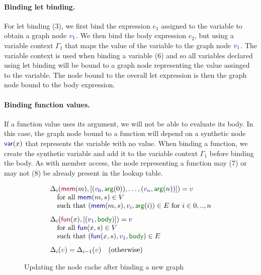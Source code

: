 \documentclass[sigplan,10pt]{acmart}\settopmatter{printfolios=true,printccs=false,printacmref=false}
\newcommand{\kvd}[1]{\textnormal{\textcolor{kvdclr}{\sffamily #1}}}
\newcommand{\bndclr}[1]{\textcolor{kvdclr}{#1}}
\newcommand{\bkndclr}[1]{\textcolor{prepclr}{#1}}
\newcommand{\bnd}[1]{\textnormal{\textcolor{kvdclr}{\sffamily #1}}}
\newcommand{\bknd}[1]{\textnormal{\textcolor{prepclr}{\sffamily #1}}}
\newcommand{\blbl}[1]{\textnormal{\textcolor{numclr}{\sffamily #1}}}
\begin{document}
\paragraph{Binding let binding.} For \kvd{let} binding (3), we first bind the expression $e_1$ assigned
to the variable to obtain a graph node $\bndclr{v_1}$. We then bind the body expression $e_2$,
but using a variable context $\Gamma_1$ that maps the value of the variable to the graph node
$\bndclr{v_1}$. The variable context is used when binding a variable (6) and so all variables 
declared using \kvd{let} binding will be bound to a graph node representing the value assinged 
to the variable. The node bound to the overall \kvd{let} expression is then the graph node bound
to the body expression.

\paragraph{Binding function values.} If a function value uses its argument, we will not be able
to evaluate its body. In this case, the graph node bound to a function will depend on a synthetic
node $\bnd{var}(x)$ that represents the variable with no value. When binding a function, we 
create the synthetic variable and add it to the variable context $\Gamma_1$ before binding the
body. As with member access, the node representing a function may (7) or may not (8) be already 
present in the lookup table.


\begin{figure}[!b]
\vspace{-0.5em}
\begin{equation*}
\begin{array}{l}
\Delta_{i}(\bknd{mem}(m), [(\bndclr{v_0},\blbl{arg}(0)),\ldots, (\bndclr{v_n},\blbl{arg}(n))]) = \bndclr{v}\\
\quad \textnormal{for all}~\bnd{mem}(m, s) \in V\\
\quad \textnormal{such that}~(\bnd{mem}(m, s), \bndclr{v_i}, \blbl{arg}(i)) \in E~\textnormal{for}~i\in 0,..,n
\\[0.75em]
\Delta_{i}(\bknd{fun}(x), [(\bndclr{v_1},\blbl{body})]) = \bndclr{v}\\
\quad \textnormal{for all}~\bnd{fun}(x, s) \in V\\
\quad \textnormal{such that}~(\bnd{fun}(x, s), \bndclr{v_1}, \blbl{body}) \in E
\\[0.75em]
\Delta_{i}(\bkndclr{v}) = \Delta_{i-1}(\bkndclr{v})\quad \textnormal{(otherwise)}
\end{array}
\end{equation*}
\vspace{-0.5em}
\caption{Updating the node cache after binding a new graph}
\label{fig:loop}
\end{figure}
\end{document}
